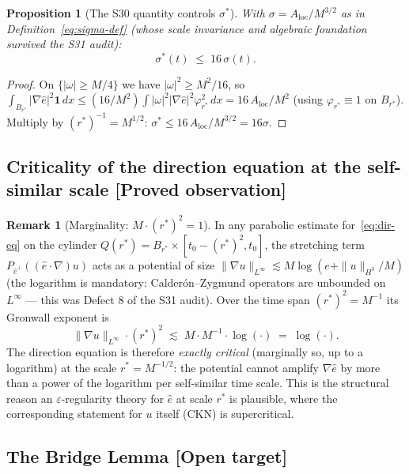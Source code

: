 \documentclass[11pt]{article}
\newtheorem{proposition}[theorem]{Proposition}
\theoremstyle{definition}
\newtheorem{remark}[theorem]{Remark}
\theoremstyle{remark}
\begin{document}
\begin{proposition}[The S30 quantity controls $\sigma^*$]\label{prop:sigma-controls}
  With $\sigma = A_{\mathrm{loc}}/M^{3/2}$ as in
  Definition~\eqref{eq:sigma-def} (whose scale invariance and algebraic
  foundation survived the S31 audit):
  \[
    \sigma^*(t) \;\leq\; 16\,\sigma(t).
  \]
\end{proposition}
\begin{proof}
  On $\{|\omega|\geq M/4\}$ we have $|\omega|^2\geq M^2/16$, so
  $\int_{B_{r^*}}|\nabla\hat{e}|^2\mathbf{1}\,dx
  \leq (16/M^2)\int |\omega|^2|\nabla\hat{e}|^2\varphi_{r^*}^2\,dx
  = 16\,A_{\mathrm{loc}}/M^2$ (using $\varphi_{r^*}\equiv 1$ on $B_{r^*}$).
  Multiply by $(r^*)^{-1}=M^{1/2}$:
  $\sigma^*\leq 16\,A_{\mathrm{loc}}/M^{3/2}=16\sigma$.
\end{proof}

\subsection{Criticality of the direction equation at the self-similar scale [Proved observation]}

\begin{remark}[Marginality: $M\cdot(r^*)^2 = 1$]\label{rem:marginality}
  In any parabolic estimate for~\eqref{eq:dir-eq} on the cylinder
  $Q(r^*) = B_{r^*}\times[t_0-(r^*)^2,t_0]$, the stretching term
  $P_{\hat{e}^{\perp}}((\hat{e}\cdot\nabla)u)$ acts as a potential of size
  $\|\nabla u\|_{L^\infty}\lesssim M\log(e+\|u\|_{H^3}/M)$ (the logarithm is
  mandatory: Calder\'on--Zygmund operators are unbounded on $L^\infty$ ---
  this was Defect 8 of the S31 audit). Over the time span $(r^*)^2 = M^{-1}$
  its Gronwall exponent is
  \[
    \|\nabla u\|_{L^\infty}\cdot (r^*)^2 \;\lesssim\; M\cdot M^{-1}\cdot\log(\cdot)
    \;=\; \log(\cdot).
  \]
  The direction equation is therefore \emph{exactly critical} (marginally
  so, up to a logarithm) at the scale $r^*=M^{-1/2}$: the potential cannot
  amplify $\nabla\hat{e}$ by more than a power of the logarithm per
  self-similar time scale. This is the structural reason an
  $\varepsilon$-regularity theory for $\hat{e}$ at scale $r^*$ is plausible,
  where the corresponding statement for $u$ itself (CKN) is supercritical.
\end{remark}

\subsection{The Bridge Lemma [Open target]}
\end{document}
